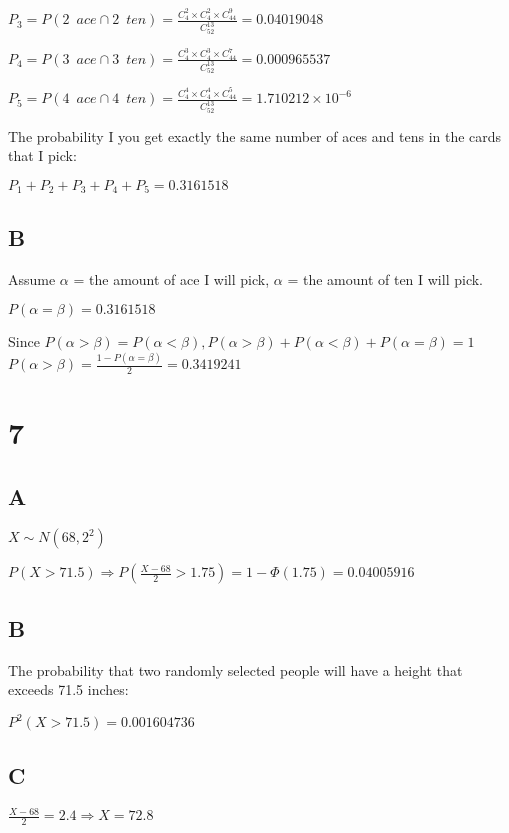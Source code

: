 \documentclass{article}
\begin{document}
	$P_3=P(2\enspace ace\cap 2\enspace ten)=\frac{ C_4^2\times C_4^2\times C_{44}^{9}}{C_{52}^{13}}=0.04019048$

	$P_4=P(3\enspace ace\cap 3\enspace ten)=\frac{C_4^3\times C_4^3\times  C_{44}^{7}}{C_{52}^{13}}=0.000965537$
	
	$P_5=P(4\enspace ace\cap 4\enspace ten)=\frac{ C_4^4\times C_4^4\times C_{44}^{5}}{C_{52}^{13}}=1.710212\times 10^{-6}$

	The probability I you get exactly the same number of aces and tens
in the cards that I pick:

	$P_1+P_2+P_3+P_4+P_5= 0.3161518$
	
	\subsection*{B}
	
	Assume $\alpha$ = the amount of ace I will pick, $\alpha$ = the amount of ten I will pick.
	
	$P(\alpha=\beta)=0.3161518$
	
	Since $P(\alpha>\beta)=P(\alpha<\beta),P(\alpha>\beta)+P(\alpha<\beta)+P(\alpha=\beta)=1$
	$P(\alpha>\beta)=\frac{1-P(\alpha=\beta)}{2}=0.3419241$
	
	\section*{7}
	
	\subsection*{A}	
	
	$X\sim N(68,2^2)$
	
	$P(X>71.5)\Rightarrow P(\frac{X-68}{2}>1.75)=1-\Phi(1.75)=0.04005916$
	
	\subsection*{B}	
	
	The probability that two randomly selected people will have a height
that exceeds 71.5 inches:

	$P^2(X>71.5)=0.001604736$
	
		
	\subsection*{C}	
	
	$\frac{X-68}{2}=2.4\Rightarrow X=72.8$
	
\end{document}
